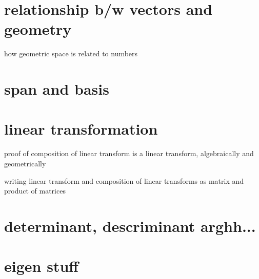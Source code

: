 \documentclass[../main.tex]{subfiles}
\begin{document}
\chapter{relationship b/w vectors and geometry}

how geometric space is related to numbers

\chapter{span and basis}

\chapter{linear transformation}

proof of composition of linear transform is a linear transform, algebraically and geometrically

writing linear transform and composition of linear transforms as matrix and product of matrices

\chapter{determinant, descriminant arghh...}

\chapter{eigen stuff}


\end{document}
